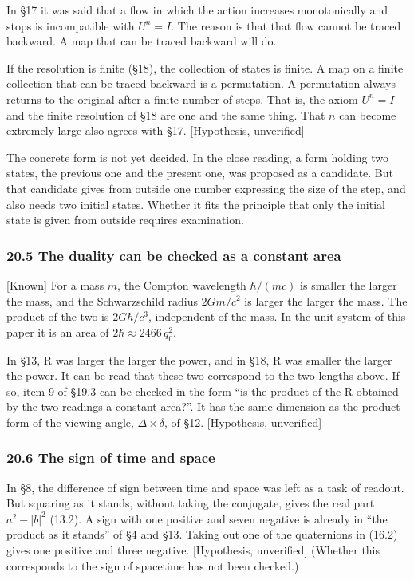 \documentclass[
  a4paper,
]{article}
\begin{document}
In §17 it was said that a flow in which the action increases
monotonically and stops is incompatible with \(U^n = I\). The reason is
that that flow cannot be traced backward. A map that can be traced
backward will do.

If the resolution is finite (§18), the collection of states is finite. A
map on a finite collection that can be traced backward is a permutation.
A permutation always returns to the original after a finite number of
steps. That is, the axiom \(U^n = I\) and the finite resolution of §18
are one and the same thing. That \(n\) can become extremely large also
agrees with §17. {[}Hypothesis, unverified{]}

The concrete form is not yet decided. In the close reading, a form
holding two states, the previous one and the present one, was proposed
as a candidate. But that candidate gives from outside one number
expressing the size of the step, and also needs two initial states.
Whether it fits the principle that only the initial state is given from
outside requires examination.

\subsubsection{20.5 The duality can be checked as a constant
area}\label{the-duality-can-be-checked-as-a-constant-area}

{[}Known{]} For a mass \(m\), the Compton wavelength \(\hbar/(mc)\) is
smaller the larger the mass, and the Schwarzschild radius \(2Gm/c^2\) is
larger the larger the mass. The product of the two is \(2G\hbar/c^3\),
independent of the mass. In the unit system of this paper it is an area
of \(2\hbar \approx 2466\,q_0^2\).

In §13, R was larger the larger the power, and in §18, R was smaller the
larger the power. It can be read that these two correspond to the two
lengths above. If so, item 9 of §19.3 can be checked in the form ``is
the product of the R obtained by the two readings a constant area?''. It
has the same dimension as the product form of the viewing angle,
\(\Delta\times\delta\), of §12. {[}Hypothesis, unverified{]}

\subsubsection{20.6 The sign of time and
space}\label{the-sign-of-time-and-space}

In §8, the difference of sign between time and space was left as a task
of readout. But squaring as it stands, without taking the conjugate,
gives the real part \(a^2 - \lvert b\rvert^2\) (13.2). A sign with one
positive and seven negative is already in ``the product as it stands''
of §4 and §13. Taking out one of the quaternions in (16.2) gives one
positive and three negative. {[}Hypothesis, unverified{]} (Whether this
corresponds to the sign of spacetime has not been checked.)
\end{document}
